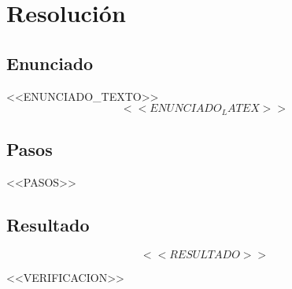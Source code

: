 \documentclass[11pt]{article}
\begin{document}
\section*{Resolución}

\subsection*{Enunciado}
<<ENUNCIADO_TEXTO>>
\[ <<ENUNCIADO_LATEX>> \]

\subsection*{Pasos}
\begin{enumerate}
<<PASOS>>
\end{enumerate}

\subsection*{Resultado}
\[ \boxed{<<RESULTADO>>} \]

<<VERIFICACION>>
\end{document}
